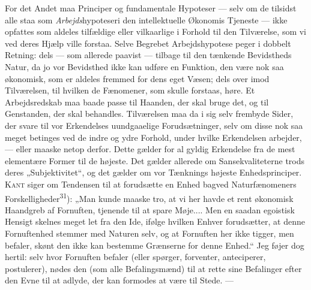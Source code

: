 \documentclass[12pt,a4paper,openany]{book}
\newcommand{\opage}[1]{\marginnote{\footnotesize\textit{[#1]}}}
\begin{document}
For det Andet maa Principer og fundamentale Hypoteser --- selv om de tilsidst
alle staa som \textit{Arbejds}hypoteseri den intellektuelle Økonomis Tjeneste
--- ikke opfattes som aldeles tilfældige eller vilkaarlige i Forhold til den
Tilværelse, som vi ved deres Hjælp ville forstaa. Selve Begrebet
Arbejdshypotese peger i dobbelt Retning: dels --- som allerede paavist ---
tilbage til den tænkende Bevidstheds Natur, da jo vor Bevidsthed ikke kan
udføre en Funktion, den være nok saa økonomisk, som er aldeles fremmed for dens
eget Væsen; dels over imod Tilværelsen, til hvilken de Fænomener, som skulle
forstaas, høre. Et Arbejdsredskab maa baade passe til Haanden, der skal bruge
det, og til Genstanden, der skal behandles. Tilværelsen maa da i sig selv
frembyde Sider, der svare til vor Erkendelses uundgaaelige Forudsætninger, selv
om disse nok saa meget betinges ved de indre og ydre Forhold, under hvilke
Erkendelsen arbejder, --- eller maaske netop derfor. Dette gælder for al gyldig
Erkendelse fra de mest elementære Former til de højeste. Det gælder allerede om
Sansekvaliteterne trods deres „Subjektivitet“, og det gælder om vor Tænknings
højeste Enhedsprinciper. \textsc{Kant} siger om Tendensen til at forudsætte en
Enhed bagved Naturfænomeners Forskelligheder\textsuperscript{31}): „Man kunde
maaske tro, at vi her havde et rent økonomisk Haandgreb af Fornuften, tjenende
til at spare Møje.... Men en saadan egoistisk Hensigt skelnes
\opage{37}meget let fra den Ide, ifølge hvilken Enhver forudsætter, at denne
Fornuftenhed stemmer med Naturen selv, og at Fornuften her ikke tigger, men
befaler, skønt den ikke kan bestemme Grænserne for denne Enhed.“ Jeg føjer dog
hertil: selv hvor Fornuften befaler (eller spørger, forventer, anteciperer,
postulerer), nødes den (som alle Befalingsmænd) til at rette sine Befalinger
efter den Evne til at adlyde, der kan formodes at være til Stede. ---
\end{document}
